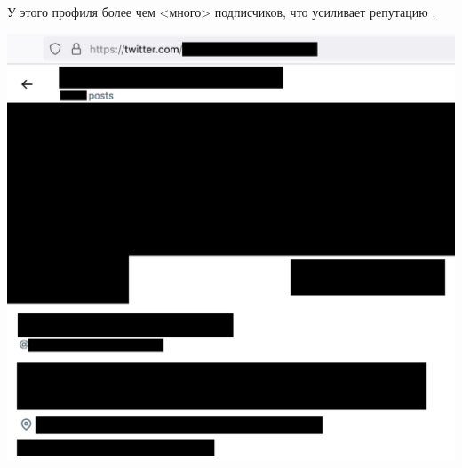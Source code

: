 
У этого профиля более чем <много> подписчиков, что усиливает репутацию \MrGdeGoogleInterviewer.

\includegraphics[width=\textwidth]{gde-google-interviewer-twitter_public}

\pagebreak
